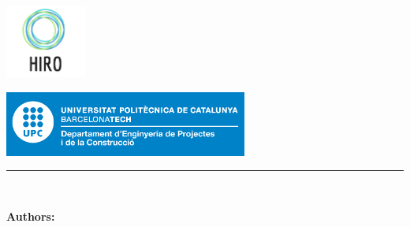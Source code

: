 
\thispagestyle{CoverPage}


\begin{center}\bf

\includegraphics[width=0.2\textwidth]{./doc_config/images/logo.png}\\
\large \researcherDept

\vspace{35pt}

\includegraphics[width=0.6\textwidth]{./doc_config/images/UPC_dpt}\\
{\large \School}

\vspace{40pt}

{\fontsize{25pt}{20pt}\selectfont \ProjectName}

\vspace{10pt}

{\fontsize{20pt}{20pt}\selectfont \Acronym}


\textcolor{UPC_blue}{\rule{\textwidth}{.6pt}}

{\Large \DocTypeI}\\
{\Large \DocTypeII}

\end{center}

\vspace{20pt}

\textbf{Authors:}\vspace{7pt}

